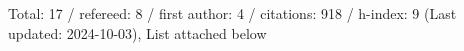 Total: 17 / refereed: 8 / first author: 4 / citations: 918 / h-index: 9 (Last updated: 2024-10-03), List attached below